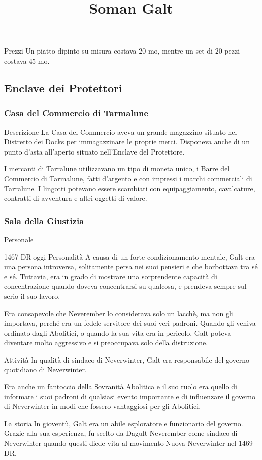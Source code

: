 \documentclass{article}
\begin{document}
Prezzi
Un piatto dipinto su misura costava 20 mo, mentre un set di 20 pezzi costava 45 mo.

          \subsection{Enclave dei Protettori}
              \subsubsection{Casa del Commercio di Tarmalune}Descrizione
La Casa del Commercio aveva un grande magazzino situato nel Distretto dei Docks per immagazzinare le proprie merci. Disponeva anche di un punto d'asta all'aperto situato nell'Enclave del Protettore.

I mercanti di Tarralune utilizzavano un tipo di moneta unico, i Barre del Commercio di Tarmalune, fatti d'argento e con impressi i marchi commerciali di Tarralune. I lingotti potevano essere scambiati con equipaggiamento, cavalcature, contratti di avventura e altri oggetti di valore.
              \subsubsection{Sala della Giustizia}
Personale
\title{\textbf{Soman Galt}} 1467 DR-oggi\newline
Personalità
A causa di un forte condizionamento mentale, Galt era una persona introversa, solitamente persa nei suoi pensieri e che borbottava tra sé e sé. Tuttavia, era in grado di mostrare una sorprendente capacità di concentrazione quando doveva concentrarsi su qualcosa, e prendeva sempre sul serio il suo lavoro.

Era consapevole che Neverember lo considerava solo un lacchè, ma non gli importava, perché era un fedele servitore dei suoi veri padroni. Quando gli veniva ordinato dagli Abolitici, o quando la sua vita era in pericolo, Galt poteva diventare molto aggressivo e si preoccupava solo della distruzione.

Attività
In qualità di sindaco di Neverwinter, Galt era responsabile del governo quotidiano di Neverwinter.

Era anche un fantoccio della Sovranità Abolitica e il suo ruolo era quello di informare i suoi padroni di qualsiasi evento importante e di influenzare il governo di Neverwinter in modi che fossero vantaggiosi per gli Abolitici.

La storia
In gioventù, Galt era un abile esploratore e funzionario del governo. Grazie alla sua esperienza, fu scelto da Dagult Neverember come sindaco di Neverwinter quando questi diede vita al movimento Nuova Neverwinter nel 1469 DR.
\end{document}
